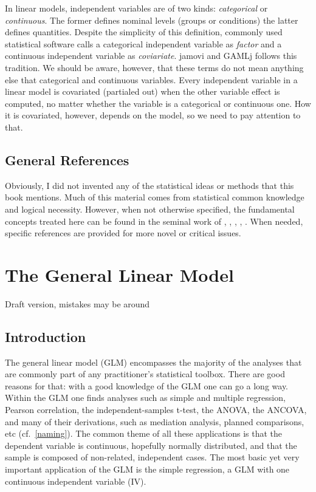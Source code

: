 \documentclass[
]{book}
\begin{document}
In linear models, independent variables are of two kinds: \emph{categorical} or \emph{continuous}. The former defines nominal levels (groups or conditions) the latter defines quantities. Despite the simplicity of this definition, commonly used statistical software calls a categorical independent variable as \emph{factor} and a continuous independent variable as \emph{coviariate}. {jamovi} and {GAMLj} follows this tradition. We should be aware, however, that these terms do not mean anything else that categorical and continuous variables. Every independent variable in a linear model is covariated (partialed out) when the other variable effect is computed, no matter whether the variable is a categorical or continuous one. How it is covariated, however, depends on the model, so we need to pay attention to that.

\hypertarget{general-references}{%
\section{General References}\label{general-references}}

Obviously, I did not invented any of the statistical ideas or methods that this book mentions. Much of this material comes from statistical common knowledge and logical necessity. However, when not otherwise specified, the fundamental concepts treated here can be found in the seminal work of \citet{cohen2014applied}, \citet{searle2016linear}, \citet{raudenbush2002hierarchical}, \citet{agresticategorical}, \citet{aiken1991multiple}. When needed, specific references are provided for more novel or critical issues.

\hypertarget{glm}{%
\chapter{The General Linear Model}\label{glm}}

{ Draft version, mistakes may be around }

\hypertarget{introduction}{%
\section{Introduction}\label{introduction}}

The general linear model (GLM) encompasses the majority of the analyses that are commonly part of any practitioner's statistical toolbox. There are good reasons for that: with a good knowledge of the GLM one can go a long way. Within the GLM one finds analyses such as simple and multiple regression, Pearson correlation, the independent-samples t-test, the ANOVA, the ANCOVA, and many of their derivations, such as mediation analysis, planned comparisons, etc (cf.~\ref{naming}). The common theme of all these applications is that the dependent variable is continuous, hopefully normally distributed, and that the sample is composed of non-related, independent cases. The most basic yet very important application of the GLM is the simple regression, a GLM with one continuous independent variable (IV).
\end{document}
